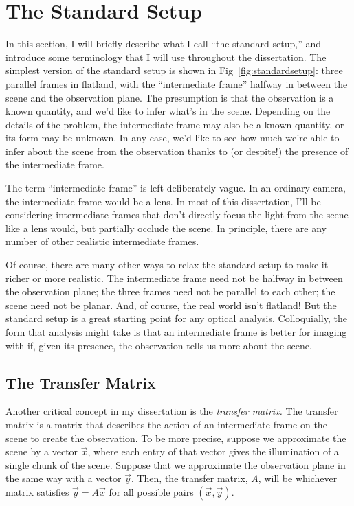\section{The Standard Setup}

In this section, I will briefly describe what I call ``the standard setup,'' and introduce some terminology that I will use throughout the dissertation. The simplest version of the standard setup is shown in Fig~\ref{fig:standardsetup}: three parallel frames in flatland, with the ``intermediate frame'' halfway in between the scene and the observation plane. The presumption is that the observation is a known quantity, and we'd like to infer what's in the scene. Depending on the details of the problem, the intermediate frame may also be a known quantity, or its form may be unknown. In any case, we'd like to see how much we're able to infer about the scene from the observation thanks to (or despite!) the presence of the intermediate frame.

The term ``intermediate frame'' is left deliberately vague. In an ordinary camera, the intermediate frame would be a lens. In most of this dissertation, I'll be considering intermediate frames that don't directly focus the light from the scene like a lens would, but partially occlude the scene. In principle, there are any number of other realistic intermediate frames.

Of course, there are many other ways to relax the standard setup to make it richer or more realistic. The intermediate frame need not be halfway in between the observation plane; the three frames need not be parallel to each other; the scene need not be planar. And, of course, the real world isn't flatland! But the standard setup is a great starting point for any optical analysis. Colloquially, the form that analysis might take is that an intermediate frame is better for imaging with if, given its presence, the observation tells us more about the scene.

\subsection{The Transfer Matrix} 

Another critical concept in my dissertation is the \emph{transfer matrix.} The transfer matrix is a matrix that describes the action of an intermediate frame on the scene to create the observation. To be more precise, suppose we approximate the scene by a vector $\vec{x}$, where each entry of that vector gives the illumination of a single chunk of the scene. Suppose that we approximate the observation plane in the same way with a vector $\vec{y}$. Then, the transfer matrix, $A$, will be whichever matrix satisfies $\vec{y} = A \vec{x}$ for all possible pairs $(\vec{x}, \vec{y})$. 

